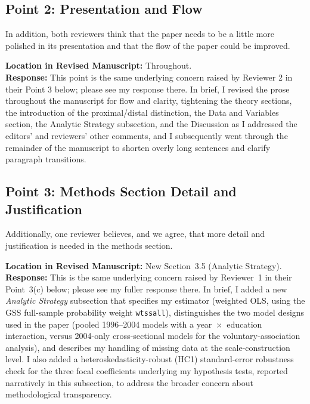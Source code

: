 \documentclass[11pt]{article}
\begin{document}
\subsection*{Point 2: Presentation and Flow}

\begin{reviewercomment}
In addition, both reviewers think that the paper needs to be a little more polished in its presentation and that the flow of the paper could be improved.
\end{reviewercomment}

\noindent\textbf{Location in Revised Manuscript:} Throughout.\\[4pt]
\textbf{Response:} This point is the same underlying concern raised by Reviewer 2 in their Point 3 below; please see my response there. In brief, I revised the prose throughout the manuscript for flow and clarity, tightening the theory sections, the introduction of the proximal/distal distinction, the Data and Variables section, the Analytic Strategy subsection, and the Discussion as I addressed the editors' and reviewers' other comments, and I subsequently went through the remainder of the manuscript to shorten overly long sentences and clarify paragraph transitions.

\subsection*{Point 3: Methods Section Detail and Justification}

\begin{reviewercomment}
Additionally, one reviewer believes, and we agree, that more detail and justification is needed in the methods section.
\end{reviewercomment}

\noindent\textbf{Location in Revised Manuscript:} New Section~3.5 (Analytic Strategy).\\[4pt]
\textbf{Response:} This is the same underlying concern raised by Reviewer~1 in their Point~3(c) below; please see my fuller response there. In brief, I added a new \textit{Analytic Strategy} subsection that specifies my estimator (weighted OLS, using the GSS full-sample probability weight \texttt{wtssall}), distinguishes the two model designs used in the paper (pooled 1996--2004 models with a year~$\times$~education interaction, versus 2004-only cross-sectional models for the voluntary-association analysis), and describes my handling of missing data at the scale-construction level. I also added a heteroskedasticity-robust (HC1) standard-error robustness check for the three focal coefficients underlying my hypothesis tests, reported narratively in this subsection, to address the broader concern about methodological transparency.
\end{document}

